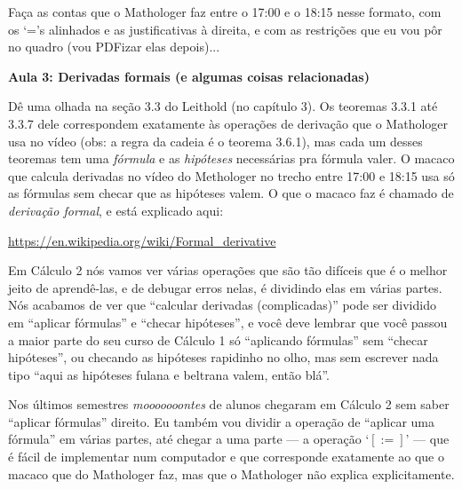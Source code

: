 \documentclass[oneside,12pt]{article}
\begin{document}
\ssk

Faça as contas que o Mathologer faz entre o 17:00 e o 18:15 nesse
formato, com os `='s alinhados e as justificativas à direita, e com as
restrições que eu vou pôr no quadro (vou PDFizar elas depois)...


\newpage


{\bf Aula 3: Derivadas formais (e algumas coisas relacionadas)}

\ssk


Dê uma olhada na seção 3.3 do Leithold (no capítulo 3). Os teoremas
3.3.1 até 3.3.7 dele correspondem exatamente às operações de derivação
que o Mathologer usa no vídeo (obs: a regra da cadeia é o teorema
3.6.1), mas cada um desses teoremas tem uma {\sl fórmula} e as {\sl
  hipóteses} necessárias pra fórmula valer. O macaco que calcula
derivadas no vídeo do Methologer no trecho entre 17:00 e 18:15 usa só
as fórmulas sem checar que as hipóteses valem. O que o macaco faz é
chamado de {\sl derivação formal}, e está explicado aqui:

\ssk

\url{https://en.wikipedia.org/wiki/Formal_derivative}

\msk

Em Cálculo 2 nós vamos ver várias operações que são tão difíceis que é
o melhor jeito de aprendê-las, e de debugar erros nelas, é dividindo
elas em várias partes. Nós acabamos de ver que ``calcular derivadas
(complicadas)'' pode ser dividido em ``aplicar fórmulas'' e ``checar
hipóteses'', e você deve lembrar que você passou a maior parte do seu
curso de Cálculo 1 só ``aplicando fórmulas'' sem ``checar hipóteses'',
ou checando as hipóteses rapidinho no olho, mas sem escrever nada tipo
``aqui as hipóteses fulana e beltrana valem, então blá''.

Nos últimos semestres {\sl mooooooontes} de alunos chegaram em Cálculo
2 sem saber ``aplicar fórmulas'' direito. Eu também vou dividir a
operação de ``aplicar uma fórmula'' em várias partes, até chegar a uma
parte --- a operação `$[:=]$' --- que é fácil de implementar num
computador e que corresponde exatamente ao que o macaco que do
Mathologer faz, mas que o Mathologer não explica explicitamente.
\end{document}
